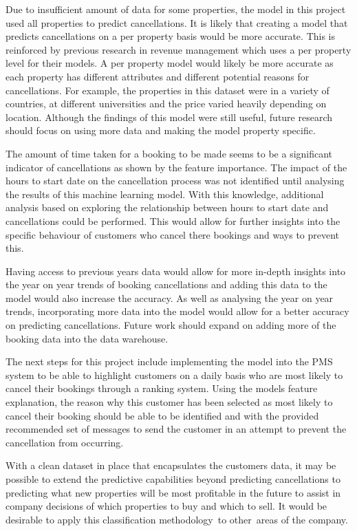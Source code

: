 \vspace{5mm}

Due to insufficient amount of data for some properties, the model in this project used all properties to predict cancellations. It is likely that creating a model that predicts cancellations on a per property basis would be more accurate. This is reinforced by previous research in revenue management which uses a per property level for their models. A per property model would likely be more accurate as each property has different attributes and different potential reasons for cancellations. For example, the properties in this dataset were in a variety of countries, at different universities and the price varied heavily depending on location. Although the findings of this model were still useful, future research should focus on using more data and making the model property specific. 

\vspace{5mm}

The amount of time taken for a booking to be made seems to be a significant indicator of cancellations as shown by the feature importance. The impact of the hours to start date on the cancellation process was not identified until analysing the results of this machine learning model. With this knowledge, additional analysis based on exploring the relationship between hours to start date and cancellations could be performed. This would allow for further insights into the specific behaviour of customers who cancel there bookings and ways to prevent this. 

\vspace{5mm}

Having access to previous years data would allow for more in-depth insights into the year on year trends of booking cancellations and adding this data to the model would also increase the accuracy.  As well as analysing the year on year trends, incorporating more data into the model would allow for a better accuracy on predicting cancellations. Future work should expand on adding more of the booking data into the data warehouse. 

\vspace{5mm}

The next steps for this project include implementing the model into the PMS system to be able to highlight customers on a daily basis who are most likely to cancel their bookings through a ranking system. Using the models feature explanation, the reason why this customer has been selected as most likely to cancel their booking should be able to be identified and with the provided recommended set of messages to send the customer in an attempt to prevent the cancellation from occurring.

\vspace{5mm}

With a clean dataset in place that encapsulates the customers data, it may be possible to extend the predictive capabilities beyond predicting cancellations to predicting what new properties will be most profitable in the future to assist in company decisions of which properties to buy and which to sell. It would be desirable to apply this classification methodology to other areas of the company.



